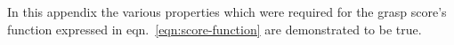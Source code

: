  \label{sec:demonstrate-score}
In this appendix the various properties which were required for the
grasp score's function expressed in eqn.~\ref{eqn:score-function} are
demonstrated to be true.

